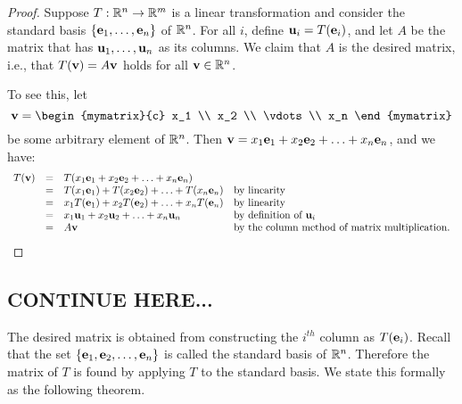 \begin{proof}
  Suppose $T:\mathbb{R}^{n}\to \mathbb{R}^{m}$ is a linear transformation and consider
  the standard basis $\left\{\mbox{\bf e}_1,\ldots,\mbox{\bf e}_n\right\}$ of $\mathbb{R}^n$.
  For all $i$, define $\mbox{\bf u}_i = T(\mbox{\bf e}_i)$, and let $A$ be the
  matrix that has $\mbox{\bf u}_1,\ldots,\mbox{\bf u}_n$ as its columns. We
  claim that $A$ is the desired matrix, i.e., that
  $T(\mbox{\bf v}) = A\mbox{\bf v}$ holds for all $\mbox{\bf v}\in\mathbb{R}^n$.

  To see this, let
  \begin{equation*}
    \vect{v} =
    \begin{mymatrix}{c} x_1 \\ x_2 \\ \vdots \\ x_n \end{mymatrix}
  \end{equation*}
  be some arbitrary element of $\mathbb{R}^n$. Then $\mbox{\bf v} = x_1\mbox{\bf e}_1
  + x_2\mbox{\bf e}_2 + \ldots + x_n\mbox{\bf e}_n$, and we have:
  \begin{equation*}
    \begin{array}{rcl@{\quad}l}
      T(\vect{v})
      &=& T(x_1\vect{e}_1 + x_2\vect{e}_2 + \ldots + x_n\vect{e}_n)
      \\
      &=& T(x_1\vect{e}_1) + T(x_2\vect{e}_2) + \ldots + T(x_n\vect{e}_n)
      & \mbox{by linearity}\\
      &=& x_1T(\vect{e}_1) + x_2T(\vect{e}_2) + \ldots + x_nT(\vect{e}_n)
      & \mbox{by linearity}\\
      &=& x_1\vect{u}_1 + x_2\vect{u}_2 + \ldots + x_n\vect{u}_n
      & \mbox{by definition of $\vect{u}_i$}\\
      &=& A\vect{v}
      & \mbox{by the column method of matrix multiplication.}
    \end{array}
  \end{equation*}
\end{proof}

\subsection{CONTINUE HERE...}

The desired matrix is obtained from constructing the $i^{th}$ column
as $T(\mbox{\bf e}_{i})$. Recall that the set
$\left\{\mbox{\bf e}_1, \mbox{\bf e}_2,\ldots, \mbox{\bf e}_n \right\}$ is called the
standard basis of $\mathbb{R}^n$. Therefore the matrix of $T$ is found by
applying $T$ to the standard basis. We state this formally as the
following theorem.


